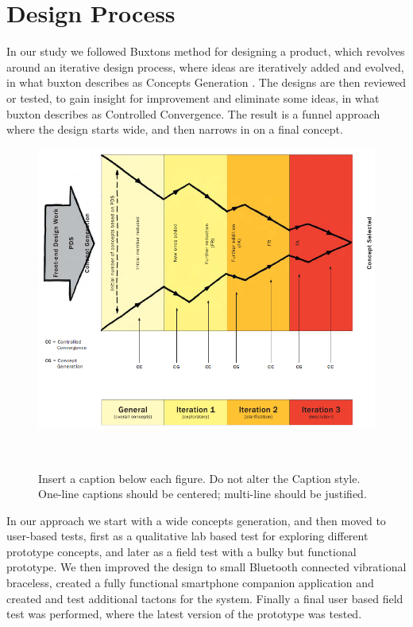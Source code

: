 \documentclass{sigchi}
\begin{document}
\section{Design Process}
In our study we followed Buxtons method for designing a product, which revolves around an iterative design process, where ideas are iteratively added and evolved, in what buxton describes as Concepts Generation \cite{buxton07}. The designs are then reviewed or tested, to gain insight for improvement and eliminate some ideas, in what buxton describes as Controlled Convergence. The result is a funnel approach where the design starts wide, and then narrows in on a final concept.
\begin{figure}
\centering
  \includegraphics[width=0.9\columnwidth]{figures/1_development_model.png}
  \caption{Insert a caption below each figure. Do not alter the
    Caption style.  One-line captions should be centered; multi-line
    should be justified. }~\label{fig:figure1}
\end{figure}
In our approach we start with a wide concepts generation, and then moved to user-based tests, first as a qualitative lab based test for exploring different prototype concepts, and later as a field test with a bulky but functional prototype. We then improved the design to small Bluetooth connected vibrational braceless, created a fully functional smartphone companion application and created and test additional tactons for the system. Finally a final user based field test was performed, where the latest version of the prototype was tested. 
\newline
\newline
\end{document}
